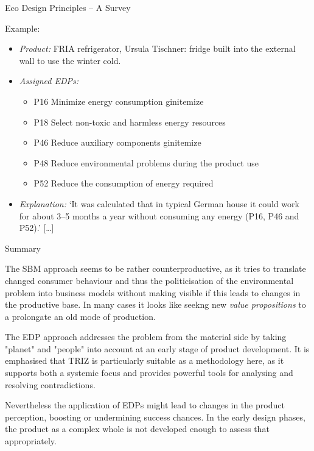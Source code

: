 \documentclass{beamer}
\begin{document}
\begin{frame}{Eco Design Principles -- A Survey}

Example:
\begin{itemize}
\item \emph{Product:} FRIA refrigerator, Ursula Tischner: fridge built into
  the external wall to use the winter cold.
\item \emph{Assigned EDPs:}
  \begin{itemize}
  \item P16 Minimize energy consumption gin{itemize}
  \item P18 Select non-toxic and harmless energy resources 
  \item P46 Reduce auxiliary components gin{itemize}
  \item P48 Reduce environmental problems during the product use
  \item P52 Reduce the consumption of energy required
  \end{itemize}
\item \emph{Explanation:} ‘It was calculated that in typical German house it
  could work for about 3–5 months a year without consuming any energy (P16,
  P46 and P52).’ [\ldots]
\end{itemize}

\end{frame}

\begin{frame}{Summary}\small

The SBM approach seems to be rather counterproductive, as it tries to
translate changed consumer behaviour and thus the politicisation of the
environmental problem into business models without making visible if this
leads to changes in the productive base.  In many cases it looks like seekng
new \emph{value propositions} to a prolongate an old mode of production.  

The EDP approach addresses the problem from the material side by taking
"planet" and "people" into account at an early stage of product development.
It is emphasised that TRIZ is particularly suitable as a methodology here, as
it supports both a systemic focus and provides powerful tools for analysing
and resolving contradictions.

Nevertheless the application of EDPs might lead to changes in the product
perception, boosting or undermining success chances. In the early design
phases, the product as a complex whole is not developed enough to assess that
appropriately.

\end{frame}
\end{document}
